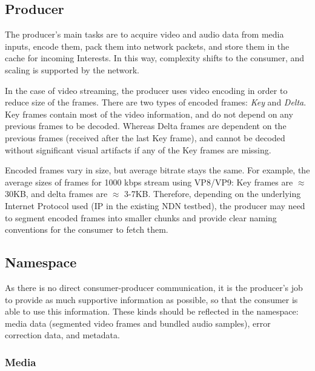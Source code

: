 \documentclass{icn/sig-alternate-2012} %
\begin{document}
\subsection{Producer}
The producer's main tasks are to acquire video and audio data from media inputs, encode them, pack them into network packets, and store them in the cache for incoming Interests. In this way, complexity shifts to the consumer, and scaling is supported by the network.

In the case of video streaming, the producer uses video encoding in order to reduce size of the frames. There are two types of encoded frames: \textit{Key} and \textit{Delta}. Key frames contain most of the video information, and do not depend on any previous frames to be decoded. Whereas Delta frames are dependent on the previous frames (received after the last Key frame), and cannot be decoded without significant visual artifacts if any of the Key frames are missing.

Encoded frames vary in size, but average bitrate stays the same. For example, the average sizes of frames for 1000 kbps stream using VP8/VP9: Key frames are $\approx$ 30KB, and delta frames are $\approx$ 3-7KB.
Therefore, depending on the underlying Internet Protocol used (IP in the existing NDN testbed), the producer may need to segment encoded frames into smaller chunks and provide clear naming conventions for the consumer to fetch them.




\subsection{Namespace}

As there is no direct consumer-producer communication, it is the producer's job to provide as much supportive information as possible, so that the consumer is able to use this information. These kinds should be reflected in the namespace:
media data (segmented video frames and bundled audio samples), error correction data, and metadata. 


\subsubsection{Media} 
\end{document}
